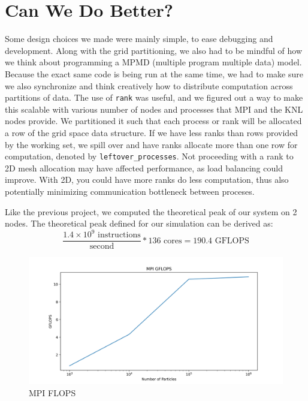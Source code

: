 \documentclass{article}
\begin{document}
\section{Can We Do Better?}
Some design choices we made were mainly simple, to ease debugging and development. Along with the grid partitioning, we also had to be mindful of how we think about programming a MPMD (multiple program multiple data) model. Because the exact same code is being run at the same time, we had to make sure we also synchronize and think creatively how to distribute computation across partitions of data. The use of \verb|rank| was useful, and we figured out a way to make this scalable with various number of nodes and processes that MPI and the KNL nodes provide. We partitioned it such that each process or rank will be allocated a row of the grid space data structure. If we have less ranks than rows provided by the working set, we spill over and have ranks allocate more than one row for computation, denoted by \verb|leftover_processes|. Not proceeding with a rank to 2D mesh allocation may have affected performance, as load balancing could improve. With 2D, you could have more ranks do less computation, thus also potentially minimizing communication bottleneck between proceses.

Like the previous project, we computed the theoretical peak of our system on 2 nodes. The theoretical peak defined for our simulation can be derived as:
$$\frac{1.4 \times 10^9 \textrm{ instructions}}{\textrm{second}} * 136 \textrm{ cores} = 190.4 \textrm{ GFLOPS}$$

\begin{figure}[H]
	\centering
	\includegraphics[width=6in]{figures/mpi_flops.png}
	\caption{MPI FLOPS}
	\label{fig:mpi-flops}
\end{figure}
\end{document}
